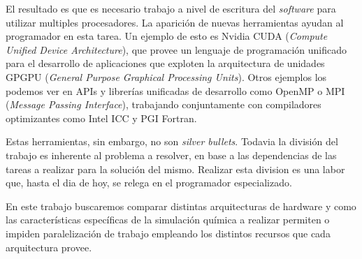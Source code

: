 El resultado es que es necesario trabajo a nivel de escritura del \textit{software}
para utilizar multiples procesadores. La aparici\'on de nuevas herramientas ayudan
al programador en esta tarea. Un ejemplo de esto es Nvidia CUDA (\textit{Compute
Unified Device Architecture}), que provee un lenguaje de programaci\'on unificado
para el desarrollo de aplicaciones que exploten la arquitectura de unidades GPGPU
(\textit{General Purpose Graphical Processing Units}). Otros ejemplos los podemos
ver en APIs y librer\'ias unificadas de desarrollo como OpenMP o MPI
(\textit{Message Passing Interface}), trabajando conjuntamente con compiladores
optimizantes como Intel ICC y PGI Fortran.

Estas herramientas, sin embargo, no son \textit{silver bullets}. Todavia la divisi\'on
del trabajo es inherente al problema a resolver, en base a las dependencias de las tareas
a realizar para la soluci\'on del mismo. Realizar esta division es una labor que, hasta
el dia de hoy, se relega en el programador especializado.

En este trabajo buscaremos comparar distintas arquitecturas de hardware y como
las caracter\'isticas espec\'ificas de la simulaci\'on qu\'imica a realizar permiten
o impiden paralelizaci\'on de trabajo empleando los distintos recursos que cada
arquitectura provee.
